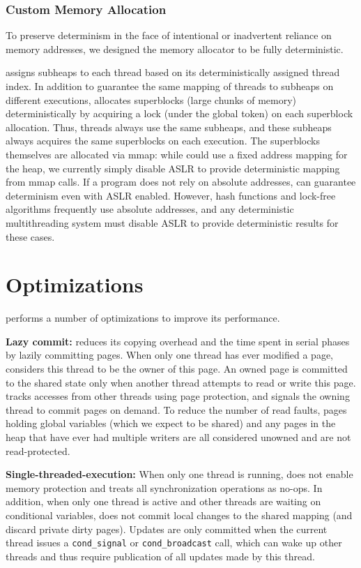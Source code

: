 \subsubsection{Custom Memory Allocation}

To preserve determinism in the face of intentional or inadvertent reliance on memory addresses, we designed the \dthreads{} memory allocator to be fully deterministic. 

\dthreads{} assigns subheaps to each thread based on its deterministically assigned thread index. In addition to guarantee the same mapping of threads to subheaps on different executions, \dthreads{} allocates superblocks (large chunks of memory) deterministically by acquiring a lock (under the global token) on each superblock allocation. Thus, threads always use the same subheaps, and these subheaps always acquires the same superblocks on each execution. The superblocks themselves are allocated via mmap: while \dthreads{} could use a fixed address mapping for the heap, we currently simply disable ASLR to provide deterministic mapping from mmap calls. If a program does not rely on absolute addresses, \dthreads{} can guarantee determinism even with ASLR enabled. However, hash functions and lock-free algorithms frequently use absolute addresses, and any deterministic multithreading system must disable ASLR to provide deterministic results for these cases.


\section{Optimizations}
\label{sec:dthreads-optimization}

\dthreads{} performs a number of optimizations to improve its performance.

\textbf{Lazy commit:} \dthreads{} reduces its copying overhead and the time spent in serial phases by lazily committing pages. When only one thread has ever modified a page, \dthreads{} considers this thread to be the owner of this page. An owned page is committed to the shared state only when another thread attempts to read or write this page. \dthreads{} tracks accesses from other threads using page protection, and signals the owning thread to commit pages on demand. To reduce the number of read faults, pages holding global variables (which we expect to be shared) and any pages in the heap that have ever had multiple writers are all considered unowned and are not read-protected.

\textbf{Single-threaded-execution: }
When only one thread is running, \dthreads{} does not enable memory protection and treats all synchronization operations as no-ops. In addition, when only one thread is active and other threads are waiting on conditional variables, \dthreads{} does not commit local changes to the shared mapping (and discard private dirty pages). Updates are only committed when the current thread issues a \texttt{cond\_signal} or \texttt{cond\_broadcast} call, which can wake up other threads and thus require publication of all updates made by this thread.

